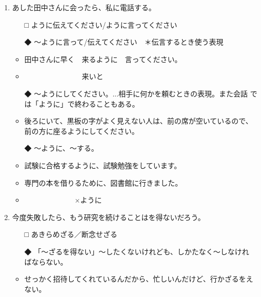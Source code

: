 \documentclass[
uplatex,
b5paper,
10pt,
dvipdfmx
]{jsbook}
\begin{document}
\begin{enumerate}
 \item あした田中さんに会ったら、私に電話する\underline{\hspace{3zw}}。
\begin{itemize}
 \item[□] ように伝えてください/ように言ってください
 \item[◆] 〜ように言って/伝えてください　＊伝言するとき使う表現
\end{itemize}
\begin{itemize}
 \item 田中さんに早く　来るように　言ってください。
 \item 　　　　　　　　来いと
\end{itemize}
\begin{itemize}
 \item[◆] 〜ようにしてください。...相手に何かを頼むときの表現。また会話
	   では「ように」で終わることもある。
\end{itemize}
\begin{itemize}
 \item 後ろにいて、黒板の字がよく見えない人は、前の席が空いているので、
       前の方に座るようにしてください。
\end{itemize}
\begin{itemize}
 \item[◆] 〜ように、〜する。
\end{itemize}
\begin{itemize}
 \item 試験に合格するように、試験勉強をしています。
 \item 専門の本を借りるために、図書館に行きました。
 \item 　　　　　　　×ように
\end{itemize}

 \item 今度失敗したら、もう研究を続けることは\underline{\hspace{3zw}}を得ないだろう。
\begin{itemize}
 \item[□] あきらめざる／断念せざる
 \item[◆] 「〜ざるを得ない」〜したくないけれども、しかたなく〜しなけれ
	   ばならない。
\end{itemize}
\begin{itemize}
 \item せっかく招待してくれているんだから、忙しいんだけど、行かざるをえ
       ない。
\end{itemize}


\end{enumerate}
\end{document}

